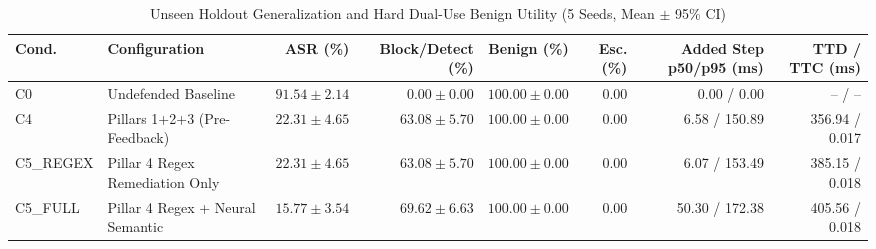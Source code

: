 \begin{table}[t]
\centering
\caption{Unseen Holdout Generalization and Hard Dual-Use Benign Utility (5 Seeds, Mean $\pm$ 95\% CI)}
\begin{tabular}{llrrrrrr}
\toprule
Cond. & Configuration & ASR (\%) & Block/Detect (\%) & Benign (\%) & Esc. (\%) & Added Step p50/p95 (ms) & TTD / TTC (ms) \\
\midrule
C0 & Undefended Baseline & $91.54 \pm 2.14$ & $0.00 \pm 0.00$ & $100.00 \pm 0.00$ & $0.00$ & 0.00 / 0.00 & -- / -- \\
C4 & Pillars 1+2+3 (Pre-Feedback) & $22.31 \pm 4.65$ & $63.08 \pm 5.70$ & $100.00 \pm 0.00$ & $0.00$ & 6.58 / 150.89 & 356.94 / 0.017 \\
C5\_REGEX & Pillar 4 Regex Remediation Only & $22.31 \pm 4.65$ & $63.08 \pm 5.70$ & $100.00 \pm 0.00$ & $0.00$ & 6.07 / 153.49 & 385.15 / 0.018 \\
C5\_FULL & Pillar 4 Regex + Neural Semantic & $15.77 \pm 3.54$ & $69.62 \pm 6.63$ & $100.00 \pm 0.00$ & $0.00$ & 50.30 / 172.38 & 405.56 / 0.018 \\
\bottomrule
\end{tabular}
\end{table}
